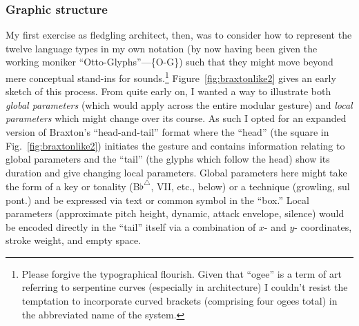     \subsubsection{Graphic structure}
    My first exercise as fledgling architect, then, was to consider how to represent the twelve language types in my own notation (by now having been given the working moniker ``Otto-Glyphs''---\{O-G\}) such that they might move beyond mere conceptual stand-ins for sounds.\footnote{Please forgive the typographical flourish. Given that ``ogee'' is a term of art referring to serpentine curves (especially in architecture) I couldn't resist the temptation to incorporate curved brackets (comprising four ogees total) in the abbreviated name of the system.} Figure~\ref{fig:braxtonlike2} gives an early sketch of this process. From quite early on, I wanted a way to illustrate both \textit{global parameters} (which would apply across the entire modular gesture) and \textit{local parameters} which might change over its course. As such I opted for an expanded version of Braxton's ``head-and-tail'' format where the ``head'' (the square in Fig.~\ref{fig:braxtonlike2}) initiates the gesture and contains information relating to global parameters and the ``tail'' (the glyphs which follow the head) show its duration and give changing local parameters. Global parameters here might take the form of a key or tonality (B$\flat^{\triangle}$, VII, etc., below) or a technique (growling, sul pont.) and be expressed via text or common symbol in the ``box.'' Local parameters (approximate pitch height, dynamic, attack envelope, silence) would be encoded directly in the ``tail'' itself via a combination of $x$- and $y$- coordinates, stroke weight, and empty space.

